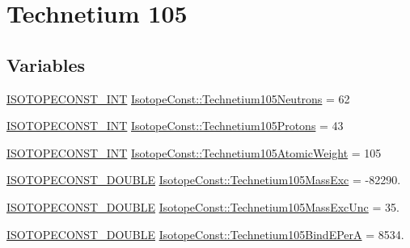 \hypertarget{group___isotope_const-_technetium-_tc105}{}\section{Technetium 105}
\label{group___isotope_const-_technetium-_tc105}
\subsection*{Variables}
\begin{DoxyCompactItemize}
\item 
\mbox{\hyperlink{group___isotope_const-_macros_ga5f18360b3e99483a35c32d789e62621c}{I\+S\+O\+T\+O\+P\+E\+C\+O\+N\+S\+T\+\_\+\+I\+NT}} \mbox{\hyperlink{group___isotope_const-_technetium-_tc105_ga035b940d5d77e71c71b0b8271b7b161a}{Isotope\+Const\+::\+Technetium105\+Neutrons}} = 62
\item 
\mbox{\hyperlink{group___isotope_const-_macros_ga5f18360b3e99483a35c32d789e62621c}{I\+S\+O\+T\+O\+P\+E\+C\+O\+N\+S\+T\+\_\+\+I\+NT}} \mbox{\hyperlink{group___isotope_const-_technetium-_tc105_ga4aee73e578ca43db235d6166189e9ab1}{Isotope\+Const\+::\+Technetium105\+Protons}} = 43
\item 
\mbox{\hyperlink{group___isotope_const-_macros_ga5f18360b3e99483a35c32d789e62621c}{I\+S\+O\+T\+O\+P\+E\+C\+O\+N\+S\+T\+\_\+\+I\+NT}} \mbox{\hyperlink{group___isotope_const-_technetium-_tc105_ga980b6a4653fa7ae34e34d6234528de48}{Isotope\+Const\+::\+Technetium105\+Atomic\+Weight}} = 105
\item 
\mbox{\hyperlink{group___isotope_const-_macros_ga8f45a7272ce02c0b4c65c44636ed719a}{I\+S\+O\+T\+O\+P\+E\+C\+O\+N\+S\+T\+\_\+\+D\+O\+U\+B\+LE}} \mbox{\hyperlink{group___isotope_const-_technetium-_tc105_gafc679e8260075e01074359f72a2928f3}{Isotope\+Const\+::\+Technetium105\+Mass\+Exc}} = -\/82290.
\item 
\mbox{\hyperlink{group___isotope_const-_macros_ga8f45a7272ce02c0b4c65c44636ed719a}{I\+S\+O\+T\+O\+P\+E\+C\+O\+N\+S\+T\+\_\+\+D\+O\+U\+B\+LE}} \mbox{\hyperlink{group___isotope_const-_technetium-_tc105_gabb2fef0cdd027414e1edcabd57b6ab06}{Isotope\+Const\+::\+Technetium105\+Mass\+Exc\+Unc}} = 35.
\item 
\mbox{\hyperlink{group___isotope_const-_macros_ga8f45a7272ce02c0b4c65c44636ed719a}{I\+S\+O\+T\+O\+P\+E\+C\+O\+N\+S\+T\+\_\+\+D\+O\+U\+B\+LE}} \mbox{\hyperlink{group___isotope_const-_technetium-_tc105_gad2fc91bc61a914402774ec074f44efd1}{Isotope\+Const\+::\+Technetium105\+Bind\+E\+PerA}} = 8534.

\end{DoxyCompactItemize}
